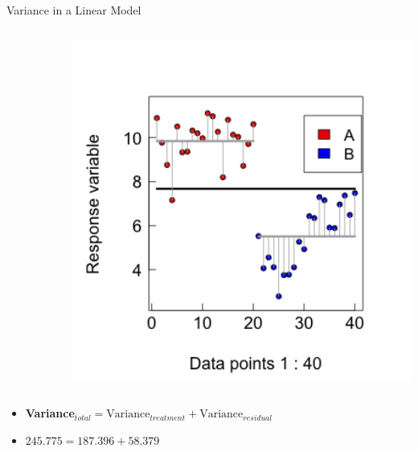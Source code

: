 \documentclass{beamer}
\begin{document}
\begin{frame}{Variance in a Linear Model}

  \begin{columns}[onlytextwidth] %
    \begin{column}{0.54\textwidth}
  \scalebox{0.6}{
      
      }
    \end{column}
    \hspace{0.02\textwidth} %
    \begin{column}{0.46\textwidth}
      \begin{center}
        \includegraphics[width=0.999\textwidth]{lectures/day_1_intro_to_mems/figures/unnamed-chunk-22-1.png}
      \end{center}
    \end{column}
  \end{columns}
  \vspace{0.06\textwidth}
  \begin{itemize}
    \item \textbf{Variance\(_{total} = \text{Variance}_{treatment} + \text{Variance}_{residual}\)}
    \item \(245.775 = 187.396 + 58.379\)
  \end{itemize}
\end{frame}
\end{document}
